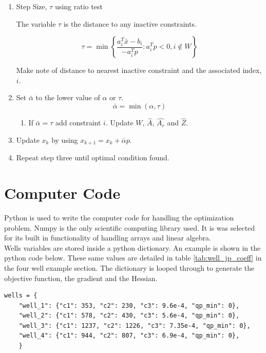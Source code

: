\documentclass{article}
\begin{document}
\begin{enumerate}
    \item Step Size, $\tau$ using ratio test

    The variable $\tau$ is the distance to any inactive constraints.
    
    \begin{equation*}
        \tau = \min \left\{ \dfrac{a_i^T \bar{x} - b_{i}}{-a_i^T p} : a_i^T p < 0, i \notin W \right \}
    \end{equation*}

    Make note of distance to nearest inactive constraint and the associated index, $i$.
    
    \item Set $\bar{\alpha}$ to the lower value of $\alpha$ or $\tau$.
        $$\bar{\alpha} = \min(\alpha, \tau)$$
        \begin{enumerate}
            \item If $\bar{\alpha} = \tau$ add constraint $i$. Update $W$, $\hat{A}$, $\hat{A_{r}}$ and $\hat{Z}$.
        \end{enumerate}

    \item Update $x_{k}$ by using $x_{k+1} = x_{k} + \bar{\alpha} p$.
    \item Repeat step three until optimal condition found.
    
\end{enumerate}

\section{Computer Code}

Python is used to write the computer code for handling the optimization problem. Numpy is the only scientific computing library used. It is was selected for its built in functionality of handling arrays and linear algebra.\\

Wells variables are stored inside a python dictionary. An example is shown in the python code below. These same values are detailed in table \ref{tab:well_jp_coeff} in the four well example section. The dictionary is looped through to generate the objective function, the gradient and the Hessian.

\begin{verbatim}
wells = {
    "well_1": {"c1": 353, "c2": 230, "c3": 9.6e-4, "qp_min": 0},
    "well_2": {"c1": 578, "c2": 430, "c3": 5.6e-4, "qp_min": 0},
    "well_3": {"c1": 1237, "c2": 1226, "c3": 7.35e-4, "qp_min": 0},
    "well_4": {"c1": 944, "c2": 807, "c3": 6.9e-4, "qp_min": 0},
    }
\end{verbatim}
\end{document}
